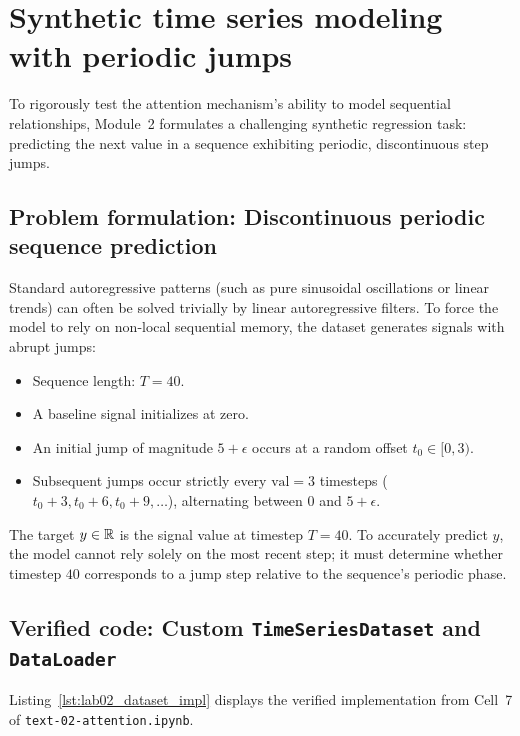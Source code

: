 \documentclass[../labs.tex]{subfiles}
\begin{document}
\section{Synthetic time series modeling with periodic jumps}
\label{sec:lab02_time_series}

To rigorously test the attention mechanism's ability to model sequential relationships, Module~2 formulates a challenging synthetic regression task: predicting the next value in a sequence exhibiting periodic, discontinuous step jumps.

\subsection{Problem formulation: Discontinuous periodic sequence prediction}

Standard autoregressive patterns (such as pure sinusoidal oscillations or linear trends) can often be solved trivially by linear autoregressive filters. To force the model to rely on non-local sequential memory, the dataset generates signals with abrupt jumps:
\begin{itemize}
    \item Sequence length: $T = 40$.
    \item A baseline signal initializes at zero.
    \item An initial jump of magnitude $5 + \epsilon$ occurs at a random offset $t_0 \in [0, 3)$.
    \item Subsequent jumps occur strictly every $\text{val} = 3$ timesteps ($t_0 + 3, t_0 + 6, t_0 + 9, \dots$), alternating between $0$ and $5 + \epsilon$.
\end{itemize}
The target $y \in \mathbb{R}$ is the signal value at timestep $T = 40$. To accurately predict $y$, the model cannot rely solely on the most recent step; it must determine whether timestep $40$ corresponds to a jump step relative to the sequence's periodic phase.

\subsection{Verified code: Custom \texttt{TimeSeriesDataset} and \texttt{DataLoader}}

Listing~\ref{lst:lab02_dataset_impl} displays the verified implementation from Cell~7 of \texttt{text-02-attention.ipynb}.
\end{document}
